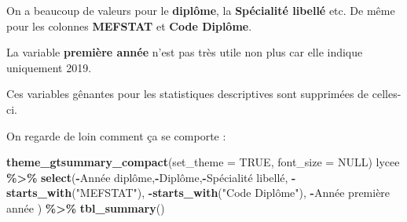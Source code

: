 \documentclass[
]{book}
\newenvironment{Shaded}{\begin{snugshade}}{\end{snugshade}}
\newcommand{\AttributeTok}[1]{\textcolor[rgb]{0.13,0.29,0.53}{#1}}
\newcommand{\ConstantTok}[1]{\textcolor[rgb]{0.56,0.35,0.01}{#1}}
\newcommand{\FunctionTok}[1]{\textcolor[rgb]{0.13,0.29,0.53}{\textbf{#1}}}
\newcommand{\NormalTok}[1]{#1}
\newcommand{\SpecialCharTok}[1]{\textcolor[rgb]{0.81,0.36,0.00}{\textbf{#1}}}
\newcommand{\StringTok}[1]{\textcolor[rgb]{0.31,0.60,0.02}{#1}}
\begin{document}
On a beaucoup de valeurs pour le \textbf{diplôme}, la \textbf{Spécialité libellé} etc.
De même pour les colonnes \textbf{MEFSTAT} et \textbf{Code Diplôme}.

La variable \textbf{première année} n'est pas très utile non plus car elle indique
uniquement 2019.

Ces variables gênantes pour les statistiques descriptives sont supprimées de
celles-ci.

On regarde de loin comment ça se comporte :

\begin{Shaded}
\begin{Highlighting}[]
\FunctionTok{theme\_gtsummary\_compact}\NormalTok{(}\AttributeTok{set\_theme =} \ConstantTok{TRUE}\NormalTok{, }\AttributeTok{font\_size =} \ConstantTok{NULL}\NormalTok{)}
\NormalTok{lycee }\SpecialCharTok{\%\textgreater{}\%} \FunctionTok{select}\NormalTok{(}\SpecialCharTok{{-}}\StringTok{\textasciigrave{}}\AttributeTok{Année diplôme}\StringTok{\textasciigrave{}}\NormalTok{,}\SpecialCharTok{{-}}\NormalTok{Diplôme,}\SpecialCharTok{{-}}\StringTok{\textasciigrave{}}\AttributeTok{Spécialité libellé}\StringTok{\textasciigrave{}}\NormalTok{,}
                 \SpecialCharTok{{-}}\FunctionTok{starts\_with}\NormalTok{(}\StringTok{"MEFSTAT"}\NormalTok{),}
                 \SpecialCharTok{{-}}\FunctionTok{starts\_with}\NormalTok{(}\StringTok{"Code Diplôme"}\NormalTok{),}
                 \SpecialCharTok{{-}}\StringTok{\textasciigrave{}}\AttributeTok{Année première année}\StringTok{\textasciigrave{}}
\NormalTok{                 ) }\SpecialCharTok{\%\textgreater{}\%} 
  \FunctionTok{tbl\_summary}\NormalTok{()}
\end{Highlighting}
\end{Shaded}
\end{document}
